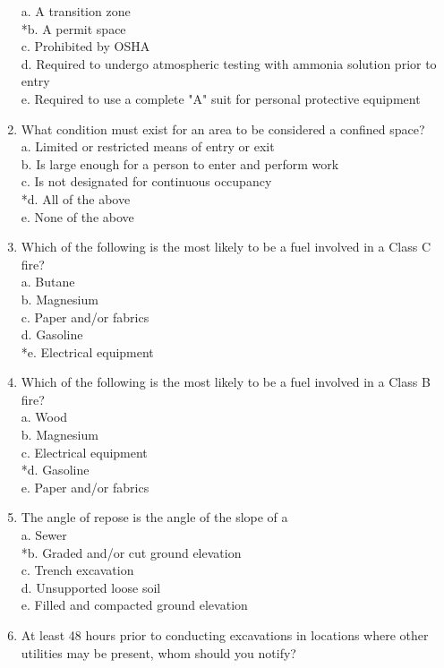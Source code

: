 \begin{enumerate}[1.]
a. A transition zone\\
*b. A permit space\\
c. Prohibited by OSHA\\
d. Required to undergo atmospheric testing with ammonia solution prior to entry\\
e. Required to use a complete "A" suit for personal protective equipment\\
\item What condition must exist for an area to be considered a confined space?\\
a. Limited or restricted means of entry or exit\\
b. Is large enough for a person to enter and perform work\\
c. Is not designated for continuous occupancy\\
*d. All of the above\\
e. None of the above\\
\item Which of the following is the most likely to be a fuel involved in a Class C fire?\\
a. Butane\\
b. Magnesium\\
c. Paper and/or fabrics\\
d. Gasoline\\
*e. Electrical equipment\\
\item Which of the following is the most likely to be a fuel involved in a Class B fire?\\
a. Wood\\
b. Magnesium\\
c. Electrical equipment\\
*d. Gasoline\\
e. Paper and/or fabrics\\
\item The angle of repose is the angle of the slope of a\\
a. Sewer\\
*b. Graded and/or cut ground elevation\\
c. Trench excavation\\
d. Unsupported loose soil\\
e. Filled and compacted ground elevation\\
\item At least 48 hours prior to conducting excavations in locations where other utilities may be present, whom should you notify?\\

\end{enumerate}
